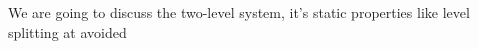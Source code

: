 We are going to discuss the two-level system, it's static properties like level splitting at avoided 